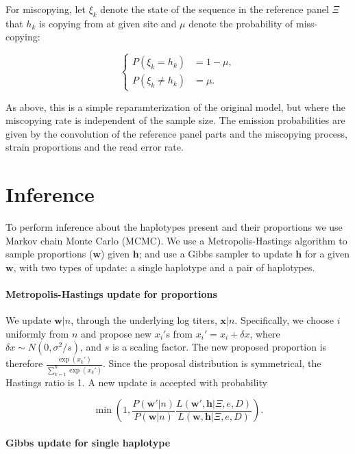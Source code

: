 \documentclass{nature}
\begin{document}
For miscopying, let $\xi_k$ denote the state of the sequence in the reference panel $\Xi$ that $h_k$ is copying from at given site and $\mu$ denote the probability of miss-copying:

$$
\begin{cases}
P(\xi_k = h_k) &= 1-\mu, \\
P(\xi_k \neq h_k) &= \mu.
\end{cases}
$$

\noindent As above, this is a simple reparamterization of the original model, but where the miscopying rate is independent of the sample size. The emission probabilities are given by the convolution of the reference panel parts and the miscopying process, strain proportions and the read error rate.




\section*{Inference}

To perform inference about the haplotypes present and their proportions we use Markov chain Monte Carlo (MCMC). We use a Metropolis-Hastings algorithm to sample proportions ($\mathbf w$) given $\mathbf h$; and use a Gibbs sampler to update $\mathbf h$ for a given $\mathbf w$, with two types of update: a single haplotype and a pair of haplotypes.


\paragraph{Metropolis-Hastings update for proportions}

We update $\mathbf{w}|n$, through the underlying log titers, $\mathbf{x}|n$. Specifically, we choose $i$ uniformly from $n$ and propose new $x_i'$s from $x_i' = x_i + \delta x$, where $\delta x \sim N(0, \sigma^2/s)$, and $s$ is a scaling factor. The new proposed proportion is therefore $\frac{\exp(x_k')}{\sum_{k=1}^n \exp(x_k')}$. Since the proposal distribution is symmetrical, the Hastings ratio is 1. A new update is accepted with probability

 $$\min\left(1, \frac{P(\mathbf{w}'|n)}{P(\mathbf{w}|n)} \frac{L(\mathbf{w}', \mathbf{h} | \Xi, e, D)}{L(\mathbf{w}, \mathbf{h} | \Xi, e, D)}\right).$$



\paragraph{Gibbs update for single haplotype}
\end{document}
